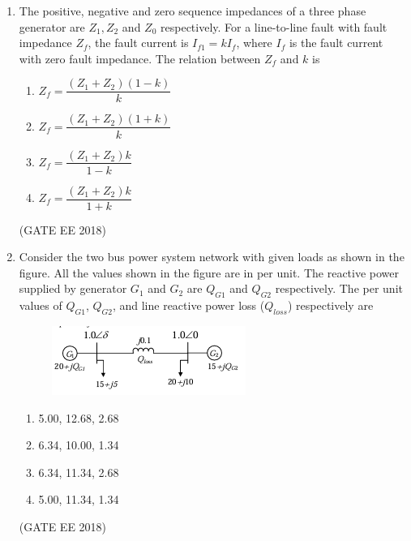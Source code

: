 \documentclass[journal,12pt,onecolumn]{IEEEtran}
\theoremstyle{remark}
\begin{document}
\begin{enumerate}
\item The positive, negative and zero sequence impedances of a three phase generator are $Z_1, Z_2$ and $Z_0$ respectively. For a line-to-line fault with fault impedance $Z_f$, the fault current is $I_{f1} = k I_f$, where $I_f$ is the fault current with zero fault impedance. The relation between $Z_f$ and $k$ is
\begin{multicols}{4}
\begin{enumerate}
    \item $Z_f = \dfrac{(Z_1+Z_2)(1-k)}{k}$
    \item $Z_f = \dfrac{(Z_1+Z_2)(1+k)}{k}$
    \item $Z_f = \dfrac{(Z_1+Z_2)k}{1-k}$
    \item $Z_f = \dfrac{(Z_1+Z_2)k}{1+k}$
\end{enumerate}
\end{multicols}
\hfill{(GATE EE 2018)}

\item Consider the two bus power system network with given loads as shown in the figure. All the values shown in the figure are in per unit. The reactive power supplied by generator $G_1$ and $G_2$ are $Q_{G1}$ and $Q_{G2}$ respectively. The per unit values of $Q_{G1}$, $Q_{G2}$, and line reactive power loss ($Q_{loss}$) respectively are
\begin{figure}[H]
    \centering
    \includegraphics[]{figs/Q.29.png}
    \caption{}
    \label{fig:9}
\end{figure}
\begin{multicols}{2}
\begin{enumerate}
    \item 5.00, 12.68, 2.68
    \item 6.34, 10.00, 1.34
    \item 6.34, 11.34, 2.68
    \item 5.00, 11.34, 1.34
\end{enumerate}
\end{multicols}
\hfill{(GATE EE 2018)}


\end{enumerate}
\end{document}
